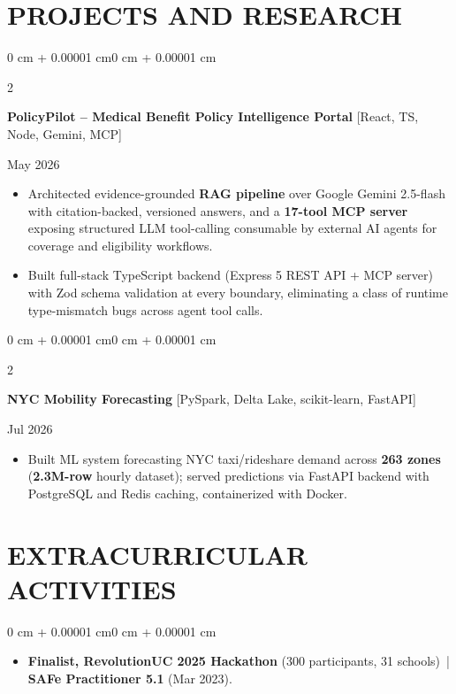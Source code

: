 \documentclass[10pt, letterpaper]{article}
\newenvironment{highlights}{
    \begin{itemize}[
        topsep=0.10 cm,
        parsep=0.06 cm,
        partopsep=0pt,
        itemsep=0.06 cm,
        leftmargin=12pt
    ]
}{
    \end{itemize}
}
\newenvironment{onecolentry}{
    \begin{adjustwidth}{0 cm + 0.00001 cm}{0 cm + 0.00001 cm}
}{
    \end{adjustwidth}
}
\newenvironment{twocolentry}[2][]{
    \onecolentry
    \def\secondColumn{#2}
    \setcolumnwidth{\fill, 4.5 cm}
    \begin{paracol}{2}
}{
    \switchcolumn \raggedleft \secondColumn
    \end{paracol}
    \endonecolentry
}
\begin{document}
\section{PROJECTS AND RESEARCH}
\begin{twocolentry}{May 2026}
\textbf{PolicyPilot -- Medical Benefit Policy Intelligence Portal} [React, TS, Node, Gemini, MCP]
\end{twocolentry}
\begin{highlights}
  \item Architected evidence-grounded \textbf{RAG pipeline} over Google Gemini 2.5-flash with citation-backed, versioned answers, and a \textbf{17-tool MCP server} exposing structured LLM tool-calling consumable by external AI agents for coverage and eligibility workflows.
  \item Built full-stack TypeScript backend (Express 5 REST API + MCP server) with Zod schema validation at every boundary, eliminating a class of runtime type-mismatch bugs across agent tool calls.
\end{highlights}

\vspace{0.12 cm}

\begin{twocolentry}{Jul 2026}
\textbf{NYC Mobility Forecasting} [PySpark, Delta Lake, scikit-learn, FastAPI]
\end{twocolentry}
\begin{highlights}
  \item Built ML system forecasting NYC taxi/rideshare demand across \textbf{263 zones} (\textbf{2.3M-row} hourly dataset); served predictions via FastAPI backend with PostgreSQL and Redis caching, containerized with Docker.
\end{highlights}

\section{EXTRACURRICULAR ACTIVITIES}
\begin{onecolentry}
\begin{highlights}
  \item \textbf{Finalist, RevolutionUC 2025 Hackathon} (300 participants, 31 schools) \,|\, \textbf{SAFe Practitioner 5.1} (Mar 2023).
\end{highlights}
\end{onecolentry}
\end{document}
